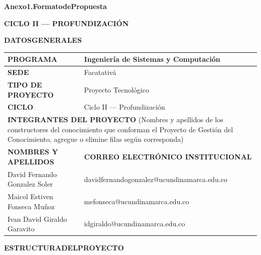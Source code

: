 \documentclass[11pt]{article}
\newcommand{\formlabel}[1]{\textbf{\small #1}}
\newcommand{\formcell}[1]{\small #1}
\begin{document}
\thispagestyle{firstpage}

\vspace{0.10cm}
{\small\bfseries\hspace{0.62cm}Anexo\hspace{0.15em}1.\hspace{0.25em}Formato\hspace{0.15em}de\hspace{0.15em}Propuesta\par}
\vspace{0.20cm}
{\centering\small\bfseries CICLO II — PROFUNDIZACIÓN\par}
\vspace{0.18cm}
{\small\bfseries\hspace{0.62cm}DATOS\hspace{0.15em}GENERALES\par}
\vspace{0.12cm}

\noindent
\begin{tabular}{|p{7.55cm}|p{7.55cm}|}
\hline
\formlabel{PROGRAMA} & \formcell{Ingeniería de Sistemas y Computación} \\
\hline
\formlabel{SEDE} & \formcell{Facatativá} \\
\hline
\formlabel{TIPO DE PROYECTO} & \formcell{Proyecto Tecnológico} \\
\hline
\formlabel{CICLO} & \formcell{Ciclo II — Profundización} \\
\hline
\multicolumn{2}{|p{15.38cm}|}{\formlabel{INTEGRANTES DEL PROYECTO} \small (Nombres y apellidos de los constructores del conocimiento que conforman el Proyecto de Gestión del Conocimiento, agregue o elimine filas según corresponda)} \\
\hline
\formlabel{NOMBRES Y APELLIDOS} & \formlabel{CORREO ELECTRÓNICO INSTITUCIONAL} \\
\hline
\formcell{David Fernando Gonzalez Soler} & \formcell{davidfernandogonzalez@ucundinamarca.edu.co} \\
\hline
\formcell{Maicol Estiven Fonseca Muñoz} & \formcell{mefonseca@ucundinamarca.edu.co} \\
\hline
\formcell{Ivan David Giraldo Garavito} & \formcell{idgiraldo@ucundinamarca.edu.co} \\
\hline
\end{tabular}

\vspace{0.22cm}
{\small\bfseries\hspace{0.62cm}ESTRUCTURA\hspace{0.20em}DEL\hspace{0.20em}PROYECTO\par}
\newpage
\end{document}

